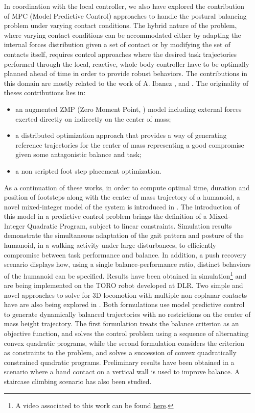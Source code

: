 \documentclass[final,5p,twocolumn]{elsarticle}
\begin{document}
In coordination with the local controller, we also have explored the contribution of MPC (Model Predictive Control) approaches to handle the postural balancing problem under varying contact conditions. The hybrid nature of the problem, where varying contact conditions can be accommodated either by adapting the internal forces distribution given a set of contact or by modifying the set of contacts itself, requires control approaches where the desired task trajectories performed through the local, reactive, whole-body controller have to be optimally planned ahead of time in order to provide robust behaviors. The contributions in this domain are mostly related to the work of A. Ibanez \cite{ibanez2013}, \cite{ibanez2014-icra} and \cite{ibanez2014-ark}. The originality of theses contributions lies in:
\begin{itemize}
	\item an augmented ZMP (Zero Moment Point, \cite{vukobratovic2004zero}) model including external forces exerted directly on indirectly on the center of mass;
	\item a distributed optimization approach that provides a way of generating reference trajectories for the center of mass representing a good compromise given some antagonistic balance and task;
	\item a non scripted foot step placement optimization.
\end{itemize}

As a  continuation of these works, in order to compute optimal time, duration and position of footsteps along with the center of mass trajectory of a humanoid, a novel mixed-integer model of the system is introduced in \cite{ibanezIROS2014}. The introduction of this model in a predictive control problem brings the definition of a Mixed-Integer Quadratic Program, subject to linear constraints. Simulation results demonstrate the simultaneous adaptation of the gait pattern and posture of the humanoid, in a walking activity under large disturbances, to efficiently compromise between task performance and balance. In addition, a push recovery scenario displays how, using a single balance-performance ratio, distinct behaviors of the humanoid can be specified. Results have been obtained in simulation\footnote{A video associated to this work can be found \href{http://pages.isir.upmc.fr/~padois/website/fichiers/videos/ibanez\_IROS2014.mp4}{here}.} and are being implemented on the TORO robot developed at DLR. Two simple and novel approaches to solve for 3D locomotion with multiple non-coplanar contacts have are also being explored in \cite{perrin2015}. Both formulations use model predictive control to generate dynamically balanced trajectories with no restrictions on the center of mass height trajectory. The first formulation treats the balance criterion as an objective function, and solves the control problem using a sequence of alternating convex quadratic programs, while the second formulation considers the criterion as constraints to the problem, and solves a succession of convex quadratically constrained quadratic programs. Preliminary results have been obtained in a scenario where a hand contact on a vertical wall is used to improve balance. A staircase climbing scenario has also been studied.\\
\end{document}
